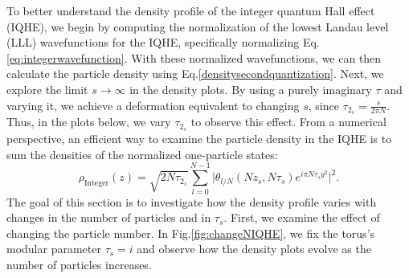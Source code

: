 \documentclass[a4paper,11pt]{article}
\begin{document}
To better understand the density profile of the integer quantum Hall effect (IQHE), we begin by computing the normalization of the lowest Landau level (LLL) wavefunctions for the IQHE, specifically normalizing Eq.\eqref{eq:integerwavefunction}. With these normalized wavefunctions, we can then calculate the particle density using Eq.\eqref{densitysecondquantization}. Next, we explore the limit $s\rightarrow \infty$ in the density plots. By using a purely imaginary $\tau$ and varying it, we achieve a deformation equivalent to changing $s$, since $\tau_{2_s}=\frac{s}{2\pi N}$. Thus, in the plots below, we vary $\tau_{2_s}$ to observe this effect. From a numerical perspective, an efficient way to examine the particle density in the IQHE is to sum the densities of the normalized one-particle states:
\begin{equation}
\rho_{\mathrm{Integer}}(z) = \sqrt{2N\tau_{2_s}}\sum_{l=0}^{N-1}\Big|\theta_{l/N}(Nz_{s},N\tau_{s})e^{i\pi N\tau_{s} y^2}\Big|^2. 
\label{densidadeinteger}
\end{equation}
The goal of this section is to investigate how the density profile varies with changes in the number of particles and in $\tau_{s}$. First, we examine the effect of changing the particle number. In Fig.\ref{fig:changeNIQHE}, we fix the torus’s modular parameter $\tau_{s}=i$ and observe how the density plots evolve as the number of particles increases.
\end{document}

